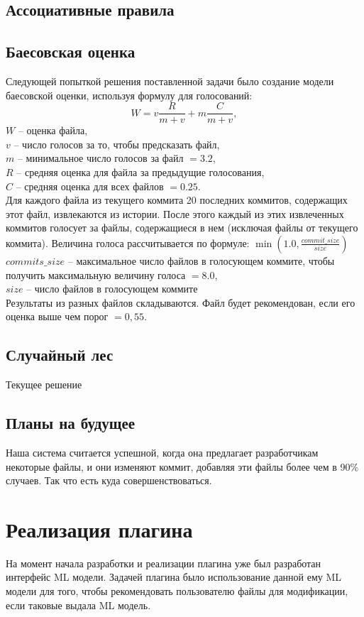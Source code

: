 \documentclass[times]{itmo-student-thesis}
\begin{document}
\section{Ассоциативные правила}

\section{Баесовская оценка}
Следующей попыткой решения поставленной задачи было создание модели баесовской оценки, используя формулу для голосований:
    $$W = v\frac{R}{m + v} + m\frac{C}{m + v},$$
$W$ -- оценка файла, \\
$v$ -- число голосов за то, чтобы предсказать файл, \\
$m$ -- минимальное число голосов за файл $= 3.2$, \\
$R$ -- средняя оценка для файла за предыдущие голосования, \\
${C}$ -- средняя оценка для всех файлов $= 0.25$. \\
Для каждого файла из текущего коммита 20 последних коммитов, содержащих этот файл, извлекаются из истории. После этого каждый из этих извлеченных коммитов голосует за файлы, содержащиеся в нем (исключая файлы от текущего коммита). Величина голоса рассчитывается по формуле: $\min(1.0, \frac{{commit\_size}}{{size}})$\\
$commits\_size$ --  максимальное число файлов в голосующем коммите, чтобы получить максимальную величину голоса $= 8.0$,\\
$size$ -- число файлов в голосующем коммите\\
Результаты из разных файлов складываются. Файл будет рекомендован, если его оценка выше чем порог $= 0,55$.
\section{Случайный лес}
Текущее решение
\section{Планы на будущее}
Наша система считается успешной, когда она предлагает разработчикам некоторые файлы, и они изменяют коммит, добавляя эти файлы более чем в 90\% случаев. Так что есть куда совершенствоваться.





\chapter{Реализация плагина}
На момент начала разработки и реализации плагина уже был разработан интерфейс ML модели. Задачей плагина было использование данной ему ML модели для того, чтобы рекомендовать пользователю файлы для модификации, если таковые выдала ML модель.
\end{document}
